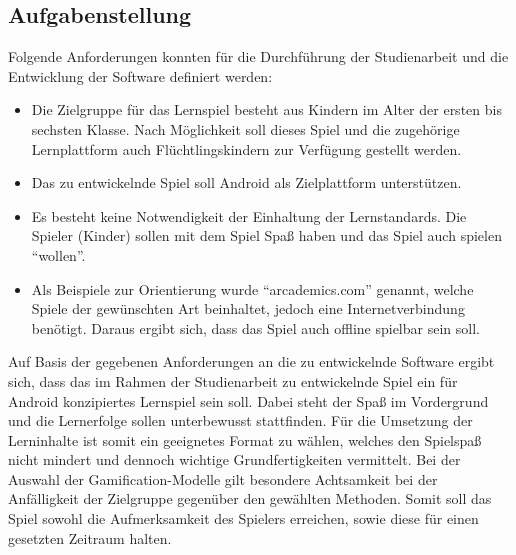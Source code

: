 \subsection{Aufgabenstellung}
	Folgende Anforderungen konnten für die Durchführung der Studienarbeit und die Entwicklung der Software definiert werden:
	\begin{itemize}
		\item Die Zielgruppe für das Lernspiel besteht aus Kindern im Alter der ersten bis sechsten Klasse. Nach Möglichkeit soll dieses Spiel und die zugehörige Lernplattform auch Flüchtlingskindern zur Verfügung gestellt werden.
		\item Das zu entwickelnde Spiel soll Android als Zielplattform unterstützen.
		\item Es besteht keine Notwendigkeit der Einhaltung der Lernstandards. Die Spieler (Kinder) sollen mit dem Spiel Spaß haben und das Spiel auch spielen \enquote{wollen}.
		\item Als Beispiele zur Orientierung wurde \enquote{arcademics.com} genannt, welche Spiele der gewünschten Art beinhaltet, jedoch eine Internetverbindung benötigt. Daraus ergibt sich, dass das Spiel auch offline spielbar sein soll.
	\end{itemize}
	Auf Basis der gegebenen Anforderungen an die zu entwickelnde Software ergibt sich, dass das im Rahmen der Studienarbeit zu entwickelnde Spiel ein für Android konzipiertes Lernspiel sein soll. Dabei steht der Spaß im Vordergrund und die Lernerfolge sollen unterbewusst stattfinden. Für die Umsetzung der Lerninhalte ist somit ein geeignetes Format zu wählen, welches den Spielspaß nicht mindert und dennoch wichtige Grundfertigkeiten vermittelt.
	Bei der Auswahl der Gamification-Modelle gilt besondere Achtsamkeit bei der Anfälligkeit der Zielgruppe gegenüber den gewählten Methoden. Somit soll das Spiel sowohl die Aufmerksamkeit des Spielers erreichen, sowie diese für einen gesetzten Zeitraum halten.

